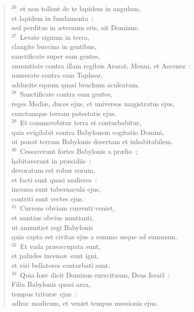 \begin{flushleft}
\begin{verse}
${}^{26}$~et non tollent de te lapidem in angulum,\\ et lapidem in fundamenta~:\\ sed perditus in \ae ternum eris, ait Dominus.\\
${}^{27}$~Levate signum in terra,\\ clangite buccina in gentibus,\\ sanctificate super eam gentes,\\ annuntiate contra illam regibus Ararat, Menni, et Ascenez~:\\ numerate contra eam Taphsar,\\ adducite equum quasi bruchum aculeatum.\\
${}^{28}$~Sanctificate contra eam gentes,\\ reges Medi\ae , duces ejus, et universos magistratus ejus,\\ cunctamque terram potestatis ejus.\\
${}^{29}$~Et commovebitur terra et conturbabitur,\\ quia evigilabit contra Babylonem cogitatio Domini,\\ ut ponat terram Babylonis desertam et inhabitabilem.\\
${}^{30}$~Cessaverunt fortes Babylonis a pr\ae lio~;\\ habitaverunt in pr\ae sidiis~:\\ devoratum est robur eorum,\\ et facti sunt quasi mulieres~:\\ incensa sunt tabernacula ejus,\\ contriti sunt vectes ejus.\\
${}^{31}$~Currens obviam currenti veniet,\\ et nuntius obvius nuntianti,\\ ut annuntiet regi Babylonis\\ quia capta est civitas ejus a summo usque ad summum.\\
${}^{32}$~Et vada pr\ae occupata sunt,\\ et paludes incens\ae\ sunt igni,\\ et viri bellatores conturbati sunt.\\
${}^{33}$~Quia h\ae c dicit Dominus exercituum, Deus Isra\"el~:\\ Filia Babylonis quasi area,\\ tempus tritur\ae\ ejus~:\\ adhuc modicum, et veniet tempus messionis ejus.\\

\end{verse}
\end{flushleft}
